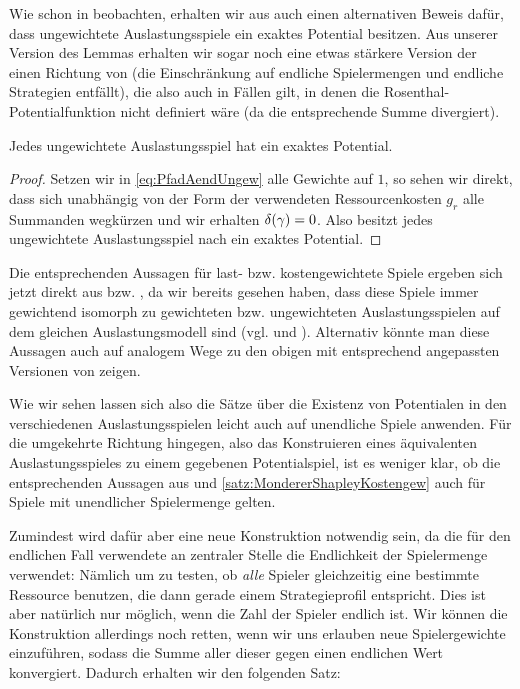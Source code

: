 Wie schon \citeauthor{CharExGewPotinWCG} in \cite{CharExGewPotinWCG} beobachten, erhalten wir aus  auch einen alternativen Beweis dafür, dass ungewichtete Auslastungsspiele ein exaktes Potential besitzen. Aus unserer Version des Lemmas erhalten wir sogar noch eine etwas stärkere Version der einen Richtung von  (die Einschränkung auf endliche Spielermengen und endliche Strategien entfällt), die also auch in Fällen gilt, in denen die Rosenthal-Potentialfunktion nicht definiert wäre (da die entsprechende Summe divergiert).

\begin{kor}\label{kor:MondererShapleyUnendl}
	Jedes ungewichtete Auslastungsspiel hat ein exaktes Potential.
\end{kor}

\begin{proof}
	Setzen wir in \eqref{eq:PfadAendUngew} alle Gewichte auf $1$, so sehen wir direkt, dass sich unabhängig von der Form der verwendeten Ressourcenkosten $g_r$ alle Summanden wegkürzen und wir erhalten $\delta(\gamma) = 0$. Also besitzt jedes ungewichtete Auslastungsspiel nach  ein exaktes Potential.
\end{proof}

\begin{bem}\label{bem:UnendlLastKostGewAusl}
	Die entsprechenden Aussagen für last- bzw. kostengewichtete Spiele ergeben sich jetzt direkt aus  bzw. , da wir bereits gesehen haben, dass diese Spiele immer gewichtend isomorph zu gewichteten bzw. ungewichteten Auslastungsspielen auf dem gleichen Auslastungsmodell sind (vgl.  und ). Alternativ könnte man diese Aussagen auch auf analogem Wege zu den obigen mit entsprechend angepassten Versionen von  zeigen.
\end{bem}

Wie wir sehen lassen sich also die Sätze über die Existenz von Potentialen in den verschiedenen Auslastungsspielen leicht auch auf unendliche Spiele anwenden. Für die umgekehrte Richtung hingegen, also das Konstruieren eines äquivalenten Auslastungsspieles zu einem gegebenen Potentialspiel, ist es weniger klar, ob die entsprechenden Aussagen aus  und \cref{satz:MondererShapleyKostengew} auch für Spiele mit unendlicher Spielermenge gelten. 

Zumindest wird dafür aber eine neue Konstruktion notwendig sein, da die für den endlichen Fall verwendete an zentraler Stelle die Endlichkeit der Spielermenge verwendet: Nämlich um zu testen, ob \emph{alle} Spieler gleichzeitig eine bestimmte Ressource benutzen, die dann gerade einem Strategieprofil entspricht. Dies ist aber natürlich nur möglich, wenn die Zahl der Spieler endlich ist. Wir können die Konstruktion allerdings noch retten, wenn wir uns erlauben neue Spielergewichte einzuführen, sodass die Summe aller dieser gegen einen endlichen Wert konvergiert. Dadurch erhalten wir den folgenden Satz:

